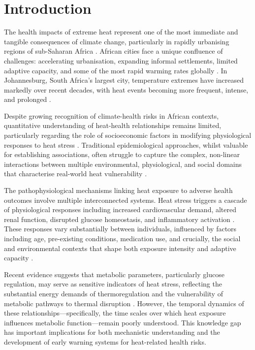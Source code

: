 \documentclass[11pt,a4paper]{article}
\begin{document}
\section{Introduction}

The health impacts of extreme heat represent one of the most immediate and tangible consequences of climate change, particularly in rapidly urbanising regions of sub-Saharan Africa \citep{Mora2017, Watts2021}. African cities face a unique confluence of challenges: accelerating urbanisation, expanding informal settlements, limited adaptive capacity, and some of the most rapid warming rates globally \citep{Engelbrecht2015, Vogel2019}. In Johannesburg, South Africa's largest city, temperature extremes have increased markedly over recent decades, with heat events becoming more frequent, intense, and prolonged \citep{Garland2015, MacLeod2021}.

Despite growing recognition of climate-health risks in African contexts, quantitative understanding of heat-health relationships remains limited, particularly regarding the role of socioeconomic factors in modifying physiological responses to heat stress \citep{Green2019, Chersich2018}. Traditional epidemiological approaches, whilst valuable for establishing associations, often struggle to capture the complex, non-linear interactions between multiple environmental, physiological, and social domains that characterise real-world heat vulnerability \citep{Gronlund2014, Benmarhnia2015}.

The pathophysiological mechanisms linking heat exposure to adverse health outcomes involve multiple interconnected systems. Heat stress triggers a cascade of physiological responses including increased cardiovascular demand, altered renal function, disrupted glucose homeostasis, and inflammatory activation \citep{Kenny2018, Periard2021}. These responses vary substantially between individuals, influenced by factors including age, pre-existing conditions, medication use, and crucially, the social and environmental contexts that shape both exposure intensity and adaptive capacity \citep{Kovats2008, Bunker2016}.

Recent evidence suggests that metabolic parameters, particularly glucose regulation, may serve as sensitive indicators of heat stress, reflecting the substantial energy demands of thermoregulation and the vulnerability of metabolic pathways to thermal disruption \citep{Lim2018, Westwood2021}. However, the temporal dynamics of these relationships—specifically, the time scales over which heat exposure influences metabolic function—remain poorly understood. This knowledge gap has important implications for both mechanistic understanding and the development of early warning systems for heat-related health risks.
\end{document}
